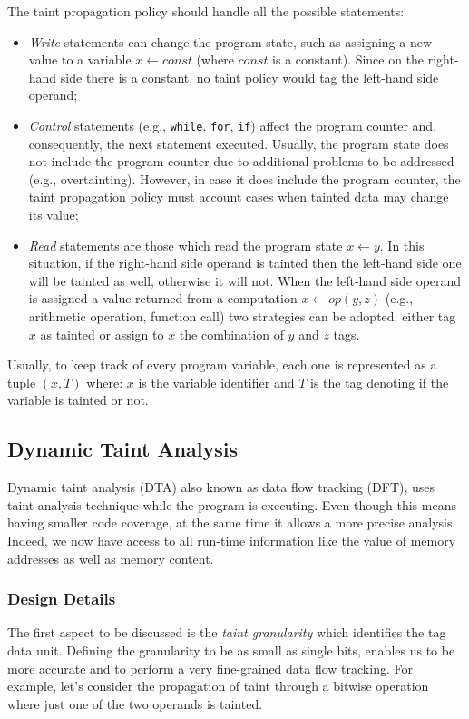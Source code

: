 \documentclass[LaM,binding=0.6cm]{sapthesis}
\begin{document}
The taint propagation policy should handle all the possible statements:
\begin{itemize}
\item \textit{Write} statements can change the program state, such as assigning a new value to a variable $x \leftarrow const$ (where $const$ is a constant). Since on the right-hand side there is a constant, no taint policy would tag the left-hand side operand;
\item \textit{Control} statements (e.g., \texttt{while}, \texttt{for}, \texttt{if}) affect the program counter and, consequently, the next statement executed. Usually, the program state does not include the program counter due to additional problems to be addressed (e.g., overtainting). However, in case it does include the program counter, the taint propagation policy must account cases when tainted data may change its value;
\item \textit{Read} statements are those which read the program state $x \leftarrow y$. In this situation, if the right-hand side operand is tainted then the left-hand side one will be tainted as well, otherwise it will not. When the left-hand side operand is assigned a value returned from a computation $x \leftarrow op(y, z)$ (e.g., arithmetic operation, function call) two strategies can be adopted: either tag $x$ as tainted or assign to $x$ the combination of $y$ and $z$ tags.
\end{itemize}
Usually, to keep track of every program variable, each one is represented as a tuple $(x, T)$ where: $x$ is the variable identifier and $T$ is the tag denoting if the variable is tainted or not. 

\subsection{Dynamic Taint Analysis}
\label{sec:dta}
Dynamic taint analysis (DTA) also known as data flow tracking (DFT), uses taint analysis technique while the program is executing. Even though this means having smaller code coverage, at the same time it allows a more precise analysis. Indeed, we now have access to all run-time information like the value of memory addresses as well as memory content.

\subsubsection{Design Details}
The first aspect to be discussed is the \textit{taint granularity} which identifies the tag data unit. Defining the granularity to be as small as single bits, enables us to be more accurate and to perform a very fine-grained data flow tracking. For example, let's consider the propagation of taint through a bitwise operation where just one of the two operands is tainted.
\end{document}
